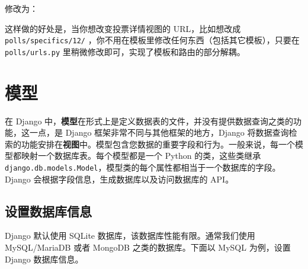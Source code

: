 \documentclass[]{ctexbook}
\newenvironment{Shaded}{\begin{snugshade}}{\end{snugshade}}
\newcommand{\NormalTok}[1]{#1}
\newcommand{\OperatorTok}[1]{\textcolor[rgb]{0.81,0.36,0.00}{\textbf{#1}}}
\newcommand{\SpecialCharTok}[1]{\textcolor[rgb]{0.00,0.00,0.00}{#1}}
\newcommand{\StringTok}[1]{\textcolor[rgb]{0.31,0.60,0.02}{#1}}
\begin{document}
修改为：

\begin{Shaded}
\end{Shaded}

这样做的好处是，当你想改变投票详情视图的 URL，比如想改成 \texttt{polls/specifics/12/} ，你不用在模板里修改任何东西（包括其它模板），只要在 \texttt{polls/urls.py} 里稍微修改即可，实现了模板和路由的部分解耦。

\hypertarget{ux6a21ux578b}{%
\section{模型}\label{ux6a21ux578b}}

在 Django 中，\textbf{模型}在形式上是定义数据表的文件，并没有提供数据查询之类的功能，这一点，是 Django 框架非常不同与其他框架的地方，Django 将数据查询检索的功能安排在\textbf{视图}中。模型包含您数据的重要字段和行为。一般来说，每一个模型都映射一个数据库表。每个模型都是一个 Python 的类，这些类继承 \texttt{django.db.models.Model}，模型类的每个属性都相当于一个数据库的字段。Django 会根据字段信息，生成数据库以及访问数据库的 API。

\hypertarget{ux8bbeux7f6eux6570ux636eux5e93ux4fe1ux606f-1}{%
\subsection{设置数据库信息}\label{ux8bbeux7f6eux6570ux636eux5e93ux4fe1ux606f-1}}

Django 默认使用 SQLite 数据库，该数据库性能有限。通常我们使用 MySQL/MariaDB 或者 MongoDB 之类的数据库。下面以 MySQL 为例，设置 Django 数据库信息。
\end{document}
